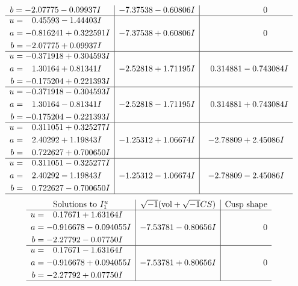 \documentclass[1p]{elsarticle_modified}
\theoremstyle{definition}
\newcommand{\I}{\sqrt{-1}}
\begin{document}
$$\begin{array}{c|c|c}
\begin{aligned}
b &= -2.07775 - 0.09937 I\end{aligned}
 & -7.37538 - 0.60806 I & \phantom{-0.000000 } 0 \\ \hline\begin{aligned}
u &= \phantom{-}0.45593 - 1.44403 I \\
a &= -0.816241 + 0.322591 I \\
b &= -2.07775 + 0.09937 I\end{aligned}
 & -7.37538 + 0.60806 I & \phantom{-0.000000 } 0 \\ \hline\begin{aligned}
u &= -0.371918 + 0.304593 I \\
a &= \phantom{-}1.30164 + 0.81341 I \\
b &= -0.175204 + 0.221393 I\end{aligned}
 & -2.52818 + 1.71195 I & \phantom{-}0.314881 - 0.743084 I \\ \hline\begin{aligned}
u &= -0.371918 - 0.304593 I \\
a &= \phantom{-}1.30164 - 0.81341 I \\
b &= -0.175204 - 0.221393 I\end{aligned}
 & -2.52818 - 1.71195 I & \phantom{-}0.314881 + 0.743084 I \\ \hline\begin{aligned}
u &= \phantom{-}0.311051 + 0.325277 I \\
a &= \phantom{-}2.40292 + 1.19843 I \\
b &= \phantom{-}0.722627 + 0.700650 I\end{aligned}
 & -1.25312 + 1.06674 I & -2.78809 + 2.45086 I \\ \hline\begin{aligned}
u &= \phantom{-}0.311051 - 0.325277 I \\
a &= \phantom{-}2.40292 - 1.19843 I \\
b &= \phantom{-}0.722627 - 0.700650 I\end{aligned}
 & -1.25312 - 1.06674 I & -2.78809 - 2.45086 I\\
 \hline 
 \end{array}$$\newpage$$\begin{array}{c|c|c}  
\text{Solutions to }I^u_{1}& \I (\text{vol} + \sqrt{-1}CS) & \text{Cusp shape}\\
 \hline 
\begin{aligned}
u &= \phantom{-}0.17671 + 1.63164 I \\
a &= -0.916678 - 0.094055 I \\
b &= -2.27792 - 0.07750 I\end{aligned}
 & -7.53781 - 0.80656 I & \phantom{-0.000000 } 0 \\ \hline\begin{aligned}
u &= \phantom{-}0.17671 - 1.63164 I \\
a &= -0.916678 + 0.094055 I \\
b &= -2.27792 + 0.07750 I\end{aligned}
 & -7.53781 + 0.80656 I & \phantom{-0.000000 } 0\\
 \hline 
 \end{array}$$\newpage\newpage\renewcommand{\arraystretch}{1}
\end{document}
